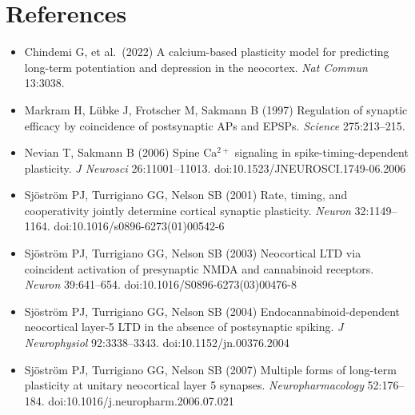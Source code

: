 \documentclass[11pt]{article}
\begin{document}
\section*{References}
\small
\begin{itemize}\setlength{\itemsep}{0pt}
\item Chindemi G, et al.\ (2022) A calcium-based plasticity model for predicting long-term potentiation and depression
      in the neocortex. \emph{Nat Commun} 13:3038.
\item Markram H, L\"ubke J, Frotscher M, Sakmann B (1997) Regulation of synaptic efficacy by coincidence of
      postsynaptic APs and EPSPs. \emph{Science} 275:213--215.
\item Nevian T, Sakmann B (2006) Spine Ca$^{2+}$ signaling in spike-timing-dependent plasticity.
      \emph{J Neurosci} 26:11001--11013. doi:10.1523/JNEUROSCI.1749-06.2006
\item Sj\"ostr\"om PJ, Turrigiano GG, Nelson SB (2001) Rate, timing, and cooperativity jointly determine cortical
      synaptic plasticity. \emph{Neuron} 32:1149--1164. doi:10.1016/s0896-6273(01)00542-6
\item Sj\"ostr\"om PJ, Turrigiano GG, Nelson SB (2003) Neocortical LTD via coincident activation of presynaptic NMDA
      and cannabinoid receptors. \emph{Neuron} 39:641--654. doi:10.1016/S0896-6273(03)00476-8
\item Sj\"ostr\"om PJ, Turrigiano GG, Nelson SB (2004) Endocannabinoid-dependent neocortical layer-5 LTD in the
      absence of postsynaptic spiking. \emph{J Neurophysiol} 92:3338--3343. doi:10.1152/jn.00376.2004
\item Sj\"ostr\"om PJ, Turrigiano GG, Nelson SB (2007) Multiple forms of long-term plasticity at unitary neocortical
      layer 5 synapses. \emph{Neuropharmacology} 52:176--184. doi:10.1016/j.neuropharm.2006.07.021
\end{itemize}
\end{document}
